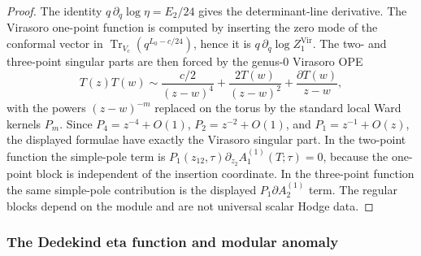 \begin{proof}
The identity \(q\,\partial_q\log\eta=E_2/24\) gives the
determinant-line derivative. The Virasoro one-point function is computed by
inserting the zero mode of the conformal vector in
\(\operatorname{Tr}_{V_c}(q^{L_0-c/24})\), hence it is
\(q\,\partial_q\log Z^{\mathrm{Vir}}_1\). The two- and three-point
singular parts are then forced by the genus-$0$ Virasoro OPE
\[
T(z)T(w)\sim \frac{c/2}{(z-w)^4}
+\frac{2T(w)}{(z-w)^2}
+\frac{\partial T(w)}{z-w},
\]
with the powers \((z-w)^{-m}\) replaced on the torus by the standard
local Ward kernels \(P_m\). Since \(P_4=z^{-4}+O(1)\),
\(P_2=z^{-2}+O(1)\), and \(P_1=z^{-1}+O(z)\), the displayed formulae
have exactly the Virasoro singular part.  In the two-point function
the simple-pole term is
\(P_1(z_{12},\tau)\partial_{z_2}A^{(1)}_1(T;\tau)=0\), because the
one-point block is independent of the insertion coordinate. In the
three-point function the same simple-pole contribution is the displayed
\(P_1\partial A^{(1)}_2\) term. The regular blocks depend on the
module and are not universal scalar Hodge data.
\end{proof}

\subsubsection*{The Dedekind eta function and modular anomaly}


